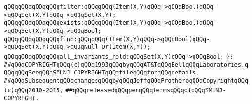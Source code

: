 \verb|qQQqqQQqqQQqqQQqfilter:qQQqqQQq(Item(X,Y)qQQq->qQQqBool)qQQq->qQQqSet(X,Y)qQQq->qQQqSet(X,Y);|\newline
\newline
\verb|qQQqqQQqqQQqqQQqexists:qQQqqQQq(Item(X,Y)qQQq->qQQqBool)qQQq->qQQqSet(X,Y)qQQq->qQQqBool;|\newline
\newline
\verb|qQQqqQQqqQQqqQQqfind:qQQqqQQq(Item(X,Y)qQQq->qQQqBool)qQQq->qQQqSet(X,Y)qQQq->qQQqNull_Or(Item(X,Y));|\newline
\newline
\verb|qQQqqQQqqQQqqQQqall_invariants_hold:qQQqSet(X,Y)qQQq->qQQqBool;|\newline
\verb|};|\newline
\newline
\newline
\verb|##qQQqCOPYRIGHTqQQq(c)qQQq1993qQQqbyqQQqAT&TqQQqBellqQQqLaboratories.qQQqqQQqSeeqQQqSMLNJ-COPYRIGHTqQQqfileqQQqforqQQqdetails.|\newline
\verb|##qQQqSubsequentqQQqchangesqQQqbyqQQqJeffqQQqProtheroqQQqCopyrightqQQq(c)qQQq2010-2015,|\newline
\verb|##qQQqreleasedqQQqperqQQqtermsqQQqofqQQqSMLNJ-COPYRIGHT.|\newline

